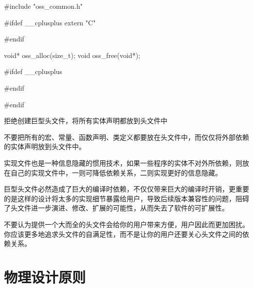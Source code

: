 \begin{content}
\begin{leftbar}
\begin{c++}[caption={oss/oss\_memery.h}]
#include "oss_common.h"

#ifdef  __cplusplus
extern "C" {
#endif

void* oss_alloc(size_t);
void  oss_free(void*);

#ifdef  __cplusplus
}
#endif

#endif
\end{c++}
\end{leftbar}

\begin{advise}
拒绝创建巨型头文件，将所有实体声明都放到头文件中
\end{advise}

不要把所有的宏、常量、函数声明、类定义都要放在头文件中，而仅仅将外部依赖的实体声明放到头文件中。

实现文件也是一种信息隐藏的惯用技术，如果一些程序的实体不对外所依赖，则放在自己的实现文件中，一则可降低依赖关系，二则实现更好的信息隐藏。

巨型头文件必然造成了巨大的编译时依赖，不仅仅带来巨大的编译时开销，更重要的是这样的设计将太多的实现细节暴露给用户，导致后续版本兼容性的问题，阻碍了头文件进一步演进、修改、扩展的可能性，从而失去了软件的可扩展性。

不要认为提供一个大而全的头文件会给你的用户带来方便，用户因此而更加困扰。你应该更多地追求头文件的自满足性，而不是让你的用户还要关心头文件之间的依赖关系。

\end{content}

\section{物理设计原则}

